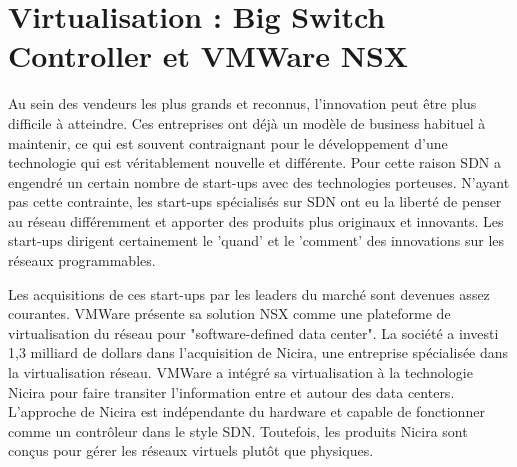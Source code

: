 \section{Virtualisation : Big Switch Controller et VMWare NSX}

Au sein des vendeurs les plus grands et reconnus, l'innovation peut être plus difficile à atteindre. Ces entreprises ont déjà un modèle de business habituel à maintenir, ce qui est souvent contraignant pour le développement d'une technologie qui est véritablement nouvelle et différente. Pour cette raison SDN a engendré un certain nombre de start-ups avec des technologies porteuses. N'ayant pas cette contrainte, les start-ups spécialisés sur SDN ont eu la liberté de penser au réseau différemment et apporter des produits plus originaux et innovants. Les start-ups dirigent certainement le 'quand' et le 'comment' des innovations sur les réseaux programmables. \cite{startupsSDN}





Les acquisitions de ces start-ups par les leaders du marché sont devenues assez courantes. VMWare présente sa solution NSX comme une plateforme de virtualisation du réseau pour "software-defined data center". La société a investi 1,3 milliard de dollars dans l'acquisition de Nicira, une entreprise spécialisée dans la virtualisation réseau.
VMWare a intégré sa virtualisation à la technologie Nicira pour faire transiter l'information entre et autour des data centers. L'approche de Nicira est indépendante du hardware et capable de fonctionner comme un contrôleur dans le style SDN. Toutefois, les produits Nicira sont conçus pour gérer les réseaux virtuels plutôt que physiques. \cite{ExecutiveGuideToSDNBigSwitch}


